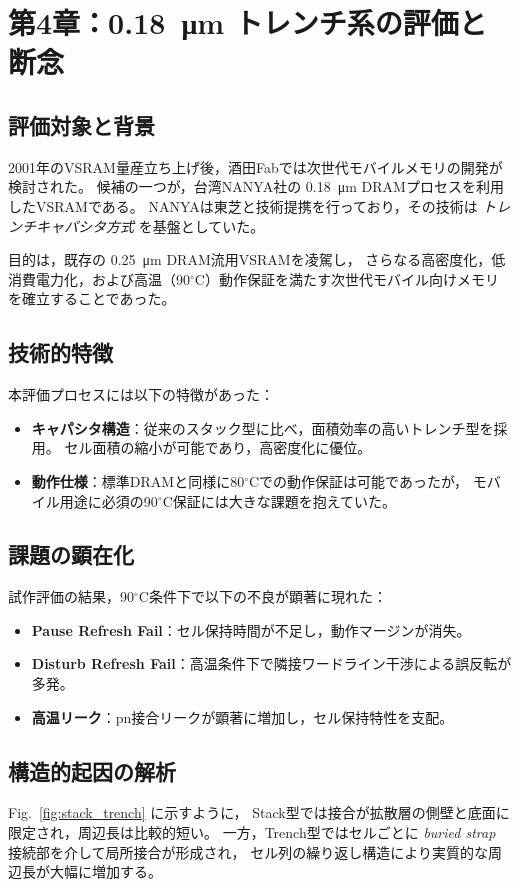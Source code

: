 \documentclass[conference]{IEEEtran}
\let\meter\metre
\begin{document}
\section{第4章：\texorpdfstring{\SI{0.18}{\micro\meter}}{0.18µm} トレンチ系の評価と断念}

\subsection{評価対象と背景}
2001年のVSRAM量産立ち上げ後，酒田Fabでは次世代モバイルメモリの開発が検討された。  
候補の一つが，台湾NANYA社の \SI{0.18}{\micro\meter} DRAMプロセスを利用したVSRAMである。  
NANYAは東芝と技術提携を行っており，その技術は \emph{トレンチキャパシタ方式} を基盤としていた。  

目的は，既存の \SI{0.25}{\micro\meter} DRAM流用VSRAMを凌駕し，  
さらなる高密度化，低消費電力化，および高温（90$^\circ$C）動作保証を満たす次世代モバイル向けメモリを確立することであった。

\subsection{技術的特徴}
本評価プロセスには以下の特徴があった：
\begin{itemize}
  \item \textbf{キャパシタ構造}：従来のスタック型に比べ，面積効率の高いトレンチ型を採用。  
        セル面積の縮小が可能であり，高密度化に優位。
  \item \textbf{動作仕様}：標準DRAMと同様に80$^\circ$Cでの動作保証は可能であったが，  
        モバイル用途に必須の90$^\circ$C保証には大きな課題を抱えていた。
\end{itemize}

\subsection{課題の顕在化}
試作評価の結果，90$^\circ$C条件下で以下の不良が顕著に現れた：
\begin{itemize}
  \item \textbf{Pause Refresh Fail}：セル保持時間が不足し，動作マージンが消失。
  \item \textbf{Disturb Refresh Fail}：高温条件下で隣接ワードライン干渉による誤反転が多発。
  \item \textbf{高温リーク}：pn接合リークが顕著に増加し，セル保持特性を支配。
\end{itemize}

\subsection{構造的起因の解析}
Fig.~\ref{fig:stack_trench} に示すように，  
Stack型では接合が拡散層の側壁と底面に限定され，周辺長は比較的短い。  
一方，Trench型ではセルごとに \emph{buried strap} 接続部を介して局所接合が形成され，  
セル列の繰り返し構造により実質的な周辺長が大幅に増加する。  
\end{document}
